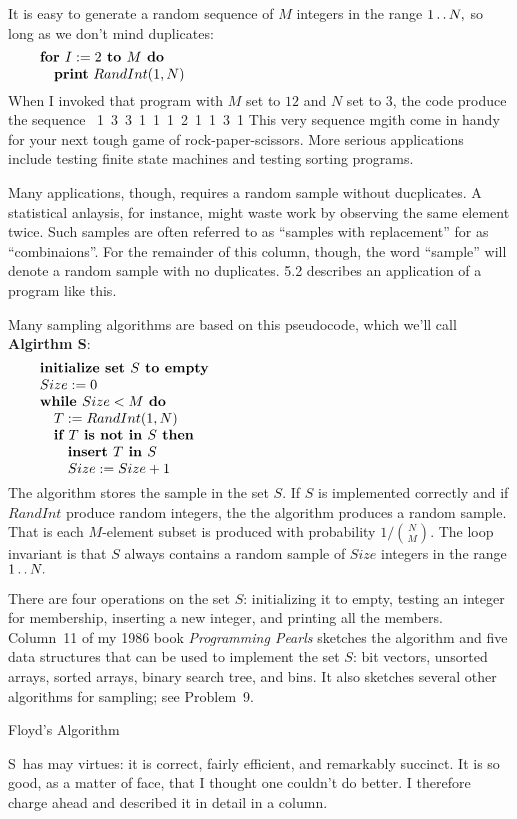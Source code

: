 It is easy to generate a random sequence of $M$ integers in the range
$1\mathinner{\ldotp\ldotp} N,$ so long as we don't mind duplicates:
$$\vbox{\let\par=\endgraf
\obeylines\sfcode`;=3000
{\bf for $I:=2$ to $M$ do}
\quad {\bf print} $RandInt(1,N)$
}$$
When I invoked that program with $M$ set to $12$ and $N$ set to $3$, the code
produce the sequence
\ 1\ 3\ 3\ 1\ 1\ 1\ 2\ 1\ 1\ 3\ 1
\enddisplay
This very sequence
mgith come in handy for your next tough game of rock-paper-scissors. More serious
applications include testing finite state machines and testing sorting programs.

Many applications, though, requires a random sample without ducplicates. A
statistical anlaysis, for instance, might waste work by observing the same
element twice. Such samples are often referred to as ``samples with replacement''
for as ``combinaions''. For the remainder of this column, though, the word
``sample'' will denote a random sample with no duplicates.
5.2 describes an application of a program like this.

Many sampling algorithms are based on this pseudocode, which we'll call
{\bf Algirthm S}:
$$\vbox{\let\par=\endgraf
\obeylines\sfcode`;=3000
{\bf initialize set $S$ to empty}
$Size := 0$
{\bf while $Size<M$ do}
\quad $T:=RandInt(1,N)$
\quad {\bf if $T$ is not in $S$ then}
\qquad {\bf insert $T$ in $S$}
\qquad $Size := Size + 1$
}$$
The algorithm stores the sample in the set $S$. If $S$ is implemented correctly
and if $RandInt$ produce random integers, the the algorithm produces a random
sample. That is each $M$-element subset is produced with probability $1/
{N\choose M}.$ The loop invariant is that $S$ always contains a random sample of
$Size$ integers in the range $1\mathinner{\ldotp\ldotp} N.$

There are four operations on the set $S$: initializing it to empty, testing an
integer for membership, inserting a new integer, and printing all the members.
Column~11 of my 1986 book {\sl Programming Pearls\/} sketches the algorithm and
five data structures that can be used to implement the set $S$: bit vectors,
unsorted arrays, sorted arrays, binary search tree, and bins. It also sketches
several other algorithms for sampling; see Problem~9.

 Floyd's Algorithm

\Alg S\ has may virtues: it is correct, fairly efficient, and remarkably
succinct. It is so good, as a matter of face, that I thought one couldn't do
better. I therefore charge ahead and described it in detail in a column.

